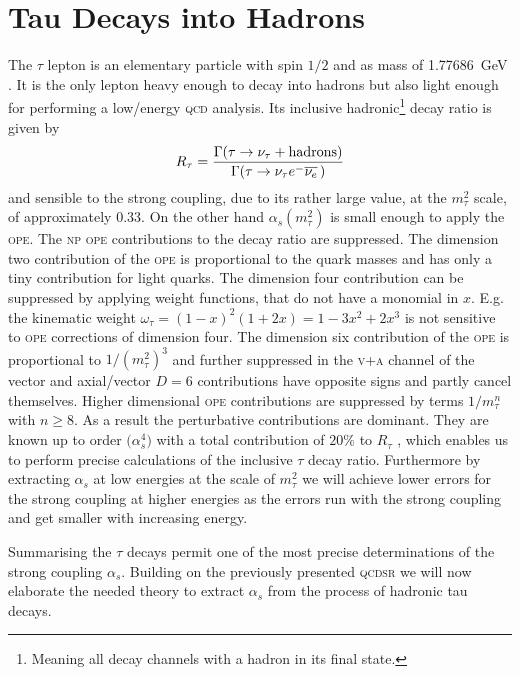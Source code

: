 \documentclass[../../index.tex]{subfiles}
\begin{document}
\chapter{Tau Decays into Hadrons}
The \(\tau\) lepton is an elementary particle with spin \(1/2\) and as mass of
\SI{1.77686}{\giga\eV} \cite{PDG2018}. It is the only lepton heavy enough to
decay into hadrons but also light enough for performing a low\-/energy
\textsc{qcd} analysis. Its inclusive hadronic\footnote{Meaning all decay
  channels with a hadron in its final state.} decay ratio is given by
\begin{equation}
  \label{eq:inclusiveRatio}
  R_\tau = \frac{\Gamma(\tau \to \nu_\tau + \text{hadrons})}{\Gamma(\tau \to \nu_\tau e^- \overline{\nu_e}\,)}
\end{equation}
and sensible to the strong coupling, due to its rather large value, at the
\(m_\tau^2\) scale, of approximately \(0.33\). On the other hand
\(\alpha_s(m_\tau^2)\) is small enough to apply the \textsc{ope}. The
\textsc{np} \textsc{ope} contributions to the decay ratio are suppressed. The
dimension two contribution of the \textsc{ope} is proportional to the quark
masses and has only a tiny contribution for light quarks. The dimension four
contribution can be suppressed by applying weight functions, that do not have a
monomial in \(x\). E.g. the kinematic weight
\(\omega_\tau=(1-x)^2(1+2x)=1-3x^2+2x^3\) is not sensitive to \textsc{ope}
corrections of dimension four. The dimension six contribution of the
\textsc{ope} is proportional to \(1/(m_\tau^2)^3\) and further suppressed in the
\textsc{v+a} channel of the vector and axial\-/vector \(D=6\)
contributions have opposite signs and partly cancel themselves. Higher dimensional
\textsc{ope} contributions are suppressed by terms \(1/m_\tau^n\) with \(n \geq
8\). As a result the perturbative contributions are dominant. They are known up
to order \(\mathcal(\alpha_s^4)\) with a total contribution of \(20\%\) to \(R_\tau\)
\cite{Pich2016a}, which enables us to perform precise calculations of the
inclusive \(\tau\) decay ratio. Furthermore by extracting \(\alpha_s\) at low
energies at the scale of \(m_\tau^2\) we will achieve lower errors for the
strong coupling at higher energies as the errors run with the strong coupling
and get smaller with increasing energy.

Summarising the \(\tau\) decays permit one of the most precise determinations of
the strong coupling \(\alpha_s\). Building on the previously presented
\textsc{qcdsr} we will now elaborate the needed theory to extract \(\alpha_s\)
from the process of hadronic tau decays.
\end{document}

